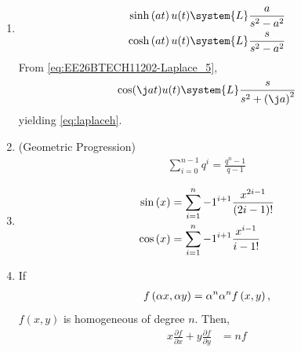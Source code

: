 \begin{enumerate}[label=\thesubsection.\arabic*,ref=\thesubsection.\theenumi]
\eqref{eq:EE26BTECH11213-mgf-prod},
\begin{align}
	\brak{pz^{-1}+q}^n &= \comb{n}{k}p^kq^{n-k}z^{-k}
	\\
         \implies    p_Y\brak{k}&=
	 \begin{cases}
		 \comb{n}{k}p^kq^{n-k} & 0 \le k \le n \\
		 0 & \text{otherwise}
 \end{cases}
\label{eq:EE26BTECH11213-pmf-bern}
\end{align}
%
using the definition in \eqref{eq:EE26BTECH11213-mgf-def} along with
\eqref{eq:EE26BTECH11213-z_transform_def}.
\item
\begin{align}
\begin{split}
\sinh\brak{at}u(t)\system{L}\frac{a}{s^2-a^2}
\\
\cosh\brak{at}u(t)\system{L}\frac{s}{s^2-a^2}
\end{split}
\label{eq:laplaceh}
\end{align}
\solution
From 
\eqref{eq:EE26BTECH11202-Laplace_5},
\begin{align}
	\cos(\j at) u(t)\system{L} \frac{s}{s^2 + \brak{\j a}^2} 
\end{align}
yielding
\eqref{eq:laplaceh}.
%
\item (Geometric Progression)
\begin{align}
	\sum_{i=0}^{n-1}q^i=\frac{q^n-1}{q-1}
	\label{eq:sumofgp}
\end{align}
\item
\begin{align}
\begin{split}
	\sin\left(x\right)&=\sum_{i=1}^{n}-1^{i+1}\frac{x^{2i-1}}{\left(2i-1\right)!}\\
	\cos\left(x\right)&=\sum_{i=1}^{n}-1^{i+1}\frac{x^{i-1}}{{i-1}!}
\end{split}
\label{eq:expansions}
\end{align}
\item If 
\begin{align}
	f\left(\alpha x,\alpha y\right)= \alpha^n
	\alpha^nf\left(x,y\right),
\end{align}
$f(x,y)$ is homogeneous of degree $n$.  Then,
\begin{align}
    x\frac{\partial f}{\partial x}+y\frac{\partial f}{\partial y}&=nf
    \label{eq:eulerhomo}
\end{align}
\end{enumerate}


